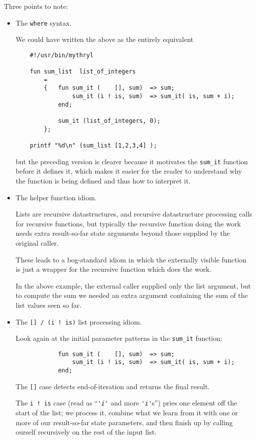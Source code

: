 Three points to note:
\begin{itemize}

\item The {\tt where} syntax.

We could have written the above as 
the entirely equivalent  
\begin{verbatim}
    #!/usr/bin/mythryl

    fun sum_list  list_of_integers
        =
        {   fun sum_it (    [], sum)  => sum;
                sum_it (i ! is, sum)  => sum_it( is, sum + i);
            end;

            sum_it (list_of_integers, 0);
        };

    printf "%d\n" (sum_list [1,2,3,4] );
\end{verbatim}
but the preceding version is clearer because it motivates the 
{\tt sum\_it} function before it defines it, which makes it easier for the 
reader to understand why the function is being defined and thus how to interpret it.

\item The helper function idiom.

Lists are recursive datastructures, and recursive datastructure processing 
calls for recursive functions, but typically the recursive function doing 
the work needs extra result-so-far state arguments beyond those supplied 
by the original caller.

These leads to a bog-standard idiom in which the 
externally visible function is just a wrapper for the recursive function 
which does the work.

In the above example, the external caller supplied only the list 
argument, but to compute the sum we needed an extra argument 
containing the sum of the list values seen so far.

\item The {\tt [] / (i ! is)} list processing idiom.

Look again at the initial parameter patterns in the {\tt sum\_it} 
function:

\begin{verbatim}
            fun sum_it (    [], sum)  => sum;
                sum_it (i ! is, sum)  => sum_it( is, sum + i);
            end;
\end{verbatim}

The {\tt []} case detects end-of-iteration and returns the final result.

The {\tt i ! is} case (read as ``{\it \verb|'i'|} and more {\it \verb|'i'|}s'') pries one element 
off the start of the list; we process it, combine what we learn from 
it with one or more of our result-so-far state parameters, and then 
finish up by calling ourself recursively on the rest of the input list.
\end{itemize}

